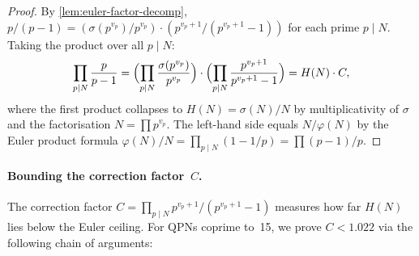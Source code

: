 \begin{proof}
By \cref{lem:euler-factor-decomp},
$p/(p-1) = (\sigma(p^{v_p})/p^{v_p}) \cdot (p^{v_p+1}/(p^{v_p+1}-1))$ for each prime $p \mid N$.
Taking the product over all $p \mid N$:
\[
  \prod_{p \mid N} \frac{p}{p-1}
  = \Bigl(\prod_{p \mid N} \frac{\sigma(p^{v_p})}{p^{v_p}}\Bigr)
    \cdot \Bigl(\prod_{p \mid N} \frac{p^{v_p+1}}{p^{v_p+1}-1}\Bigr)
  = H(N) \cdot C,
\]
where the first product collapses to
$H(N) = \sigma(N)/N$ by multiplicativity of $\sigma$ and the factorisation $N = \prod p^{v_p}$.
The left-hand side equals $N/\varphi(N)$ by the Euler product formula
$\varphi(N)/N = \prod_{p\mid N}(1 - 1/p) = \prod(p-1)/p$.
\end{proof}

\paragraph{Bounding the correction factor~$C$.}
The correction factor
$C = \prod_{p\mid N} p^{v_p+1}/(p^{v_p+1}-1)$ measures how far $H(N)$
lies below the Euler ceiling.  For QPNs coprime to~15, we prove
$C < 1.022$ via the following chain of arguments:

